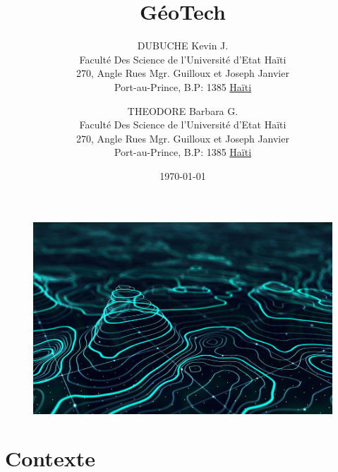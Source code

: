 \documentclass[a4paper,12pt]{report}
\begin{document}
\begin{figure}[t]
        \centering
        \includegraphics[width=1\textwidth]{GIS}
        \label{image-GIS}
        \end{figure}

\title{GéoTech}
\author{
        DUBUCHE Kevin J. \\
        Faculté Des Science de l'Université d'Etat Haïti\\
        270, Angle Rues Mgr. Guilloux et Joseph Janvier\\
        Port-au-Prince, B.P: 1385 \underline{Haïti}
        \and
        THEODORE Barbara G.\\
        Faculté Des Science de l'Université d'Etat Haïti\\
        270, Angle Rues Mgr. Guilloux et Joseph Janvier \\
        Port-au-Prince, B.P: 1385  \underline{Haïti}
}
\date{\today}
\maketitle

\tableofcontents
\newpage
{}








\chapter{Contexte}


















\end{document}
